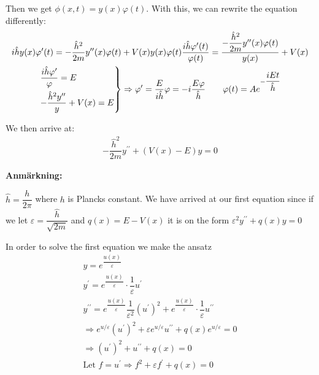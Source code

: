 \noindent Then we get $\phi(x,t) = y(x)\varphi(t)$. With this, we can rewrite the equation differently:
\begin{equation*}
  \begin{gathered}
    i\hat{h}y(x)\varphi^{\prime}(t) = -\dfrac{\hat{h}^2}{2m}y^{\prime\prime}(x)\varphi(t)+V(x)y(x)\varphi(t)
    \dfrac{i\hat{h}\varphi^{\prime}(t)}{\varphi(t)} = \dfrac{-\dfrac{\hat{h}^2}{2m}y^{\prime\prime}(x)\varphi(t)}{y(x)}+V(x)\\
    \begin{rcases*}
      \dfrac{i\hat{h}\varphi^{\prime}}{\varphi} = E\\
      -\dfrac{\hat{h}^2y^{\prime\prime}}{y}+V(x) = E
    \end{rcases*}\Rightarrow \varphi^{\prime} = \dfrac{E}{i\hat{h}}\varphi = -i\dfrac{E\varphi}{\hat{h}}\qquad\varphi(t) = Ae^{-\dfrac{iEt}{\hat{h}}}
  \end{gathered}
\end{equation*}
\par\bigskip
\noindent We then arrive at:
\begin{equation*}
  \begin{gathered}
    -\dfrac{\hat{h}^2}{2m}y^{\prime\prime}+(V(x)-E)y=0
  \end{gathered}
\end{equation*}
\par\bigskip
\noindent\textbf{Anmärkning:}\par
\noindent $\hat{h} = \dfrac{h}{2\pi}$ where $h$ is Plancks constant. We have arrived at our first equation since if we let $\varepsilon = \dfrac{\hat{h}}{\sqrt{2m}}$ and $q(x) = E-V(x)$ it is on the form $\varepsilon^2y^{\prime\prime}+q(x)y=0$
\par\bigskip
\noindent In order to solve the first equation we make the ansatz
\begin{equation*}
  \begin{gathered}
    y = e^{\dfrac{u(x)}{\varepsilon}}\\
    y^{\prime} = e^{\dfrac{u(x)}{\varepsilon}}\cdot\dfrac{1}{\varepsilon}u^{\prime}\\
    y^{\prime\prime}= e^{\dfrac{u(x)}{\varepsilon}}\dfrac{1}{\varepsilon^2}(u^{\prime})^2+e^{\dfrac{u(x)}{\varepsilon}}\cdot\dfrac{1}{\varepsilon}u^{\prime\prime}\\
    \Rightarrow e^{u/\varepsilon}(u^{\prime})^2 + \varepsilon e^{u/\varepsilon}u^{\prime\prime}+q(x)e^{u/\varepsilon} = 0\\
    \Rightarrow (u^{\prime})^2 + u^{\prime\prime}+q(x) = 0\\
    \text{Let } f=u^{\prime}\Rightarrow f^2+\varepsilon f^{\prime} + q(x)  =0
  \end{gathered}
\end{equation*}
